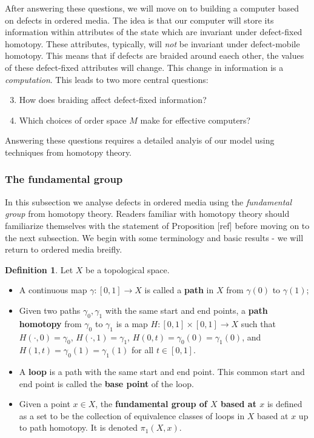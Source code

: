 \documentclass{article}
\theoremstyle{definition}
\newtheorem*{definition}{Definition}
\numberwithin{figure}{section}
\begin{document}
After answering these questions, we will move on to building a computer based on defects in ordered media. The idea is that our computer will store its information within attributes of the state which are invariant under defect-fixed homotopy. These attributes, typically, will \textit{not} be invariant under defect-mobile homotopy. This means that if defects are braided around eaech other, the values of these defect-fixed attributes will change. This change in information is a \textit{computation}. This leads to two more central questions:

\begin{enumerate}
\setcounter{enumi}{2}
\item How does braiding affect defect-fixed information?
\item Which choices of order  space $M$ make for effective computers?
\end{enumerate}

Answering these questions requires a detailed analyis of our model using techniques from homotopy theory.

\subsubsection{The fundamental group}

In this subsection we analyse defects in ordered media using the \textit{fundamental group} from homotopy theory. Readers familiar with homotopy theory should familiarize themselves with the statement of Proposition [ref] before moving on to the next subsection. We begin with some terminology and basic results - we will return to ordered media breifly.

\begin{definition} Let $X$ be a topological space.
\begin{itemize}
\item A continuous map $\gamma:[0,1]\to X$ is called a \textbf{path} in $X$ from $\gamma(0)$ to $\gamma(1)$;
\item Given two paths $\gamma_0,\gamma_1$ with the same start and end points, a \textbf{path homotopy} from $\gamma_0$ to $\gamma_1$ is a map $H:[0,1]\times [0,1]\to X$ such that $H(\cdot,0)=\gamma_0$, $H(\cdot,1)=\gamma_1$, $H(0,t)=\gamma_0(0)=\gamma_1(0)$, and $H(1,t)=\gamma_0(1)=\gamma_1(1)$ for all $t\in [0,1]$.
\item A \textbf{loop} is a path with the same start and end point. This common start and end point is called the \textbf{base point} of the loop.
\item Given a point $x\in X$, the \textbf{fundamental group of $X$ based at $x$} is defined as a set to be the collection of equivalence classes of loops in $X$ based at $x$ up to path homotopy. It is denoted $\pi_1(X,x)$.
\end{itemize}
\end{definition}
\end{document}
